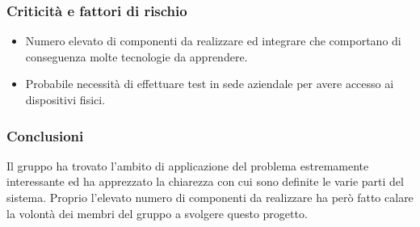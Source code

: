 \subsubsection{Criticità e fattori di rischio}
\begin{itemize}
	\item Numero elevato di componenti da realizzare ed integrare che comportano di conseguenza molte tecnologie da apprendere. 
	\item Probabile necessità di effettuare test in sede aziendale per avere accesso ai dispositivi fisici.
\end{itemize}
\subsubsection{Conclusioni}
Il gruppo ha trovato l'ambito di applicazione del problema estremamente interessante ed ha apprezzato la chiarezza con cui sono definite le varie parti del sistema. Proprio l'elevato numero di componenti da realizzare ha però fatto calare la volontà dei membri del gruppo a svolgere questo progetto.
